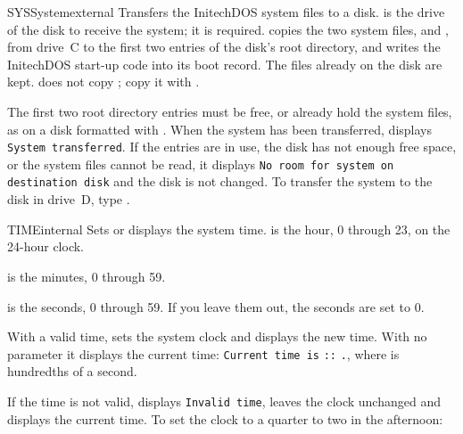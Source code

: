 \begin{DosEntry}{SYS}{System}{external}
\Purpose Transfers the InitechDOS system files to a disk.
\Format {}
\Remarks
{} is the drive of the disk to receive the system; it is required.
 copies the two system files,  and ,
from drive~C to the first two entries of the disk's root directory, and
writes the InitechDOS start-up code into its boot record.  The files already
on the disk are kept.   does not copy ; copy it
with .

The first two root directory entries must be free, or already hold the
system files, as on a disk formatted with .  When the system
has been transferred,  displays \texttt{System transferred}.  If
the entries are in use, the disk has not enough free space, or the system
files cannot be read, it displays \texttt{No room for system on destination
disk} and the disk is not changed.
\Example
To transfer the system to the disk in drive~D, type .
\end{DosEntry}

\begin{DosEntry}{TIME}{}{internal}
\Purpose Sets or displays the system time.
\Format {}
\Remarks
{} is the hour, 0 through 23, on the 24-hour clock.

 is the minutes, 0 through 59.

 is the seconds, 0 through 59.  If you leave them out, the
seconds are set to 0.

With a valid time,  sets the system clock and displays the new
time.  With no parameter it displays the current time:
\texttt{Current time is} \texttt{:}\texttt{:}%
\texttt{.}, where  is hundredths of a second.

If the time is not valid,  displays \texttt{Invalid time}, leaves
the clock unchanged and displays the current time.
\Example
To set the clock to a quarter to two in the afternoon:
\end{DosEntry}

